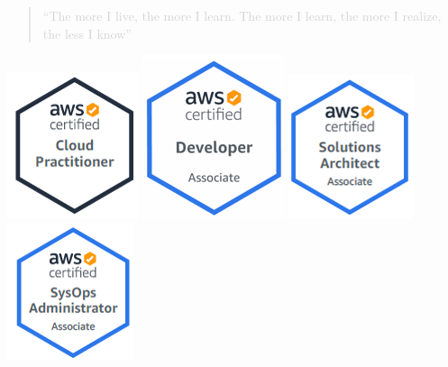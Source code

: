 \documentclass[10pt,a4paper,ragged2e]{altacv}
\begin{document}
\begin{paracol}{2}


\begin{quote}
\textcolor{LightGrey}{``The more I live, the more I learn. The more I learn, the more I realize, the less I know''}
\end{quote}





\includegraphics[width=0.1 \textwidth]{clf} \includegraphics[width=0.1 \textwidth]{dva} \includegraphics[width=0.1 \textwidth]{saa} \includegraphics[width=0.1 \textwidth]{soa}\\


\end{paracol}
\end{document}
